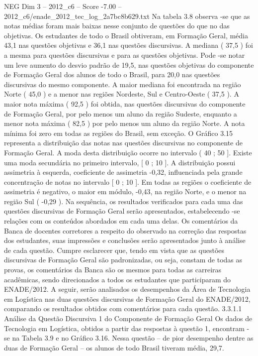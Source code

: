 \begin{textsample}{NEG Dim 3 – 2012\_c6 – Score -7.00 – 2012\_c6/enade\_2012\_tec\_log\_2a7bc8b629.txt}
Na tabela 3.8 observa -se que as notas médias foram mais baixas nesse conjunto de questões do que no das objetivas.
Os estudantes de todo o Brasil obtiveram, em Formação Geral, média 43,1 nas questões objetivas e 36,1 nas questões discursivas.
A mediana ( 37,5 ) foi a mesma para questões discursivas e para as questões objetivas.
Pode -se notar um leve aumento do desvio padrão de 19,5, nas questões objetivas do componente de Formação Geral dos alunos de todo o Brasil, para 20,0 nas questões discursivas do mesmo componente.
A maior mediana foi encontrada na região Norte ( 45,0 ) e a menor nas regiões Nordeste, Sul e Centro-Oeste ( 37,5 ).
A maior nota máxima ( 92,5 ) foi obtida, nas questões discursivas do componente de Formação Geral, por pelo menos um aluno da região Sudeste, enquanto a menor nota máxima ( 82,5 ) por pelo menos um aluno da região Norte.
A nota mínima foi zero em todas as regiões do Brasil, sem exceção.
O Gráfico 3.15 representa a distribuição das notas nas questões discursivas no componente de Formação Geral.
A moda desta distribuição ocorre no intervalo ( 40 ; 50 ].
Existe uma moda secundária no primeiro intervalo, [ 0 ; 10 ].
A distribuição possui assimetria à esquerda, coeficiente de assimetria -0,32, influenciada pela grande concentração de notas no intervalo [ 0 ; 10 ].
Em todas as regiões o coeficiente de assimetria é negativo, o maior em módulo, -0,43, na região Norte, e o menor na região Sul ( -0,29 ).
Na sequência, os resultados verificados para cada uma das questões discursivas de Formação Geral serão apresentados, estabelecendo -se relações com os conteúdos abordados em cada uma delas.
Os comentários da Banca de docentes corretores a respeito do observado na correção das respostas dos estudantes, suas impressões e conclusões serão apresentados junto à análise de cada questão.
Cumpre esclarecer que, tendo em vista que as questões discursivas de Formação Geral são padronizadas, ou seja, constam de todas as provas, os comentários da Banca são os mesmos para todas as carreiras acadêmicas, sendo direcionados a todos os estudantes que participaram do ENADE/2012.
A seguir, serão analisados os desempenhos da Área de Tecnologia em Logística nas duas questões discursivas de Formação Geral do ENADE/2012, comparando os resultados obtidos com comentários para cada questão. 3.3.1.1 Análise da Questão Discursiva 1 do Componente de Formação Geral Os dados de Tecnologia em Logística, obtidos a partir das respostas à questão 1, encontram -se na Tabela 3.9 e no Gráfico 3.16.
Nessa questão – de pior desempenho dentre as duas de Formação Geral – os alunos de todo Brasil tiveram média, 29,7.

\end{textsample}
